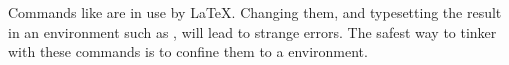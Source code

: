 Commands like  are in use by \LaTeX. Changing them, and
typesetting the result in an environment such as  , will lead to
strange errors.
The safest way to tinker with these commands is to confine
them to a  environment.
